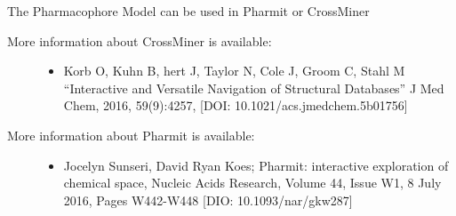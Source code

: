 \documentclass[letterpaper,10pt,english]{sphinxmanual}
\begin{document}
\begin{sphinxVerbatim}[commandchars=\\\{\}]
   
\end{sphinxVerbatim}

\begin{sphinxVerbatim}[commandchars=\\\{\}]
  
  
\end{sphinxVerbatim}

The Pharmacophore Model can be used in Pharmit or CrossMiner

\begin{sphinxVerbatim}[commandchars=\\\{\}]
   
    
\end{sphinxVerbatim}
\begin{description}
\item[{More information about CrossMiner is available:}] \leavevmode\begin{itemize}
\item {} 
Korb O, Kuhn B, hert J, Taylor N, Cole J, Groom C, Stahl M “Interactive and Versatile Navigation of Structural Databases” J Med Chem, 2016, 59(9):4257, {[}DOI: 10.1021/acs.jmedchem.5b01756{]}

\end{itemize}

\item[{More information about Pharmit is available:}] \leavevmode\begin{itemize}
\item {} 
Jocelyn Sunseri, David Ryan Koes; Pharmit: interactive exploration of chemical space, Nucleic Acids Research, Volume 44, Issue W1, 8 July 2016, Pages W442-W448 {[}DIO: 10.1093/nar/gkw287{]}

\end{itemize}

\end{description}
\end{document}
